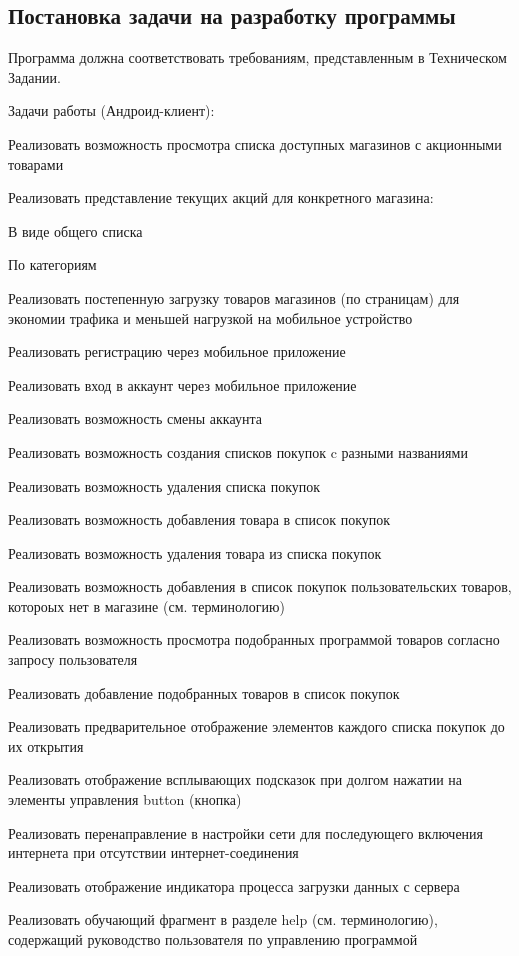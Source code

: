 \subsection{Постановка задачи на разработку программы}
\tab[0.75cm]Программа должна соответствовать требованиям, представленным в 
Техническом 
Задании.

\bigskip
Задачи работы (Андроид-клиент):

\smallskip
\begin{my_enumerate}
\item Реализовать возможность просмотра списка доступных магазинов с акционными товарами
\item Реализовать представление текущих акций для конкретного магазина:
    \begin{my_enumerate}
    \item В виде общего списка
    \item По категориям
    \end{my_enumerate}
\item Реализовать постепенную загрузку товаров магазинов (по страницам) для экономии трафика и меньшей нагрузкой на мобильное устройство
\item Реализовать регистрацию через мобильное приложение
\item Реализовать вход в аккаунт через мобильное приложение
\item Реализовать возможность смены аккаунта
\item Реализовать возможность создания списков покупок c разными названиями
\item Реализовать возможность удаления списка покупок
\item Реализовать возможность добавления товара в список покупок
\item Реализовать возможность удаления товара из списка покупок
\item Реализовать возможность добавления в список покупок пользовательских товаров, котороых нет в магазине (см. терминологию)
\item Реализовать возможность просмотра подобранных программой товаров согласно запросу пользователя
\item Реализовать добавление подобранных товаров в список покупок
\item Реализовать предварительное отображение элементов каждого списка покупок до их открытия
\item Реализовать отображение всплывающих подсказок при долгом нажатии на элементы управления button (кнопка)
\item Реализовать перенаправление в настройки сети для последующего включения интернета при отсутствии интернет-соединения
\item Реализовать отображение индикатора процесса загрузки данных с сервера
\item Реализовать обучающий фрагмент в разделе help (см. терминологию), содержащий руководство пользователя по управлению программой
\end{my_enumerate}

